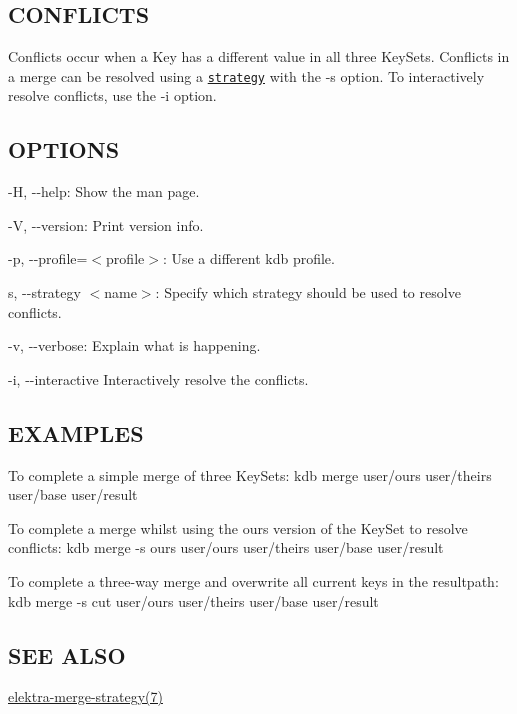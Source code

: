 \subsection*{C\+O\+N\+F\+L\+I\+C\+T\+S}

Conflicts occur when a Key has a different value in all three Key\+Sets. Conflicts in a merge can be resolved using a \href{#STRATEGIES}{\tt strategy} with the {\ttfamily -\/s} option. To interactively resolve conflicts, use the {\ttfamily -\/i} option.

\subsection*{O\+P\+T\+I\+O\+N\+S}


\begin{DoxyItemize}
\item {\ttfamily -\/\+H}, {\ttfamily -\/-\/help}\+: Show the man page.
\item {\ttfamily -\/\+V}, {\ttfamily -\/-\/version}\+: Print version info.
\item {\ttfamily -\/p}, {\ttfamily -\/-\/profile}=$<$profile$>$\+: Use a different kdb profile.
\item {\ttfamily s}, {\ttfamily -\/-\/strategy $<$name$>$}\+: Specify which strategy should be used to resolve conflicts.
\item {\ttfamily -\/v}, {\ttfamily -\/-\/verbose}\+: Explain what is happening.
\item {\ttfamily -\/i}, {\ttfamily -\/-\/interactive} Interactively resolve the conflicts.
\end{DoxyItemize}

\subsection*{E\+X\+A\+M\+P\+L\+E\+S}

To complete a simple merge of three Key\+Sets\+: {\ttfamily kdb merge user/ours user/theirs user/base user/result}

To complete a merge whilst using the {\ttfamily ours} version of the Key\+Set to resolve conflicts\+: {\ttfamily kdb merge -\/s ours user/ours user/theirs user/base user/result}

To complete a three-\/way merge and overwrite all current keys in the {\ttfamily resultpath}\+: {\ttfamily kdb merge -\/s cut user/ours user/theirs user/base user/result}

\subsection*{S\+E\+E A\+L\+S\+O}


\begin{DoxyItemize}
\item \hyperlink{md_doc_help_elektra-merge-strategy_doc_help_elektra-merge-strategy_md}{elektra-\/merge-\/strategy(7)} 
\end{DoxyItemize}